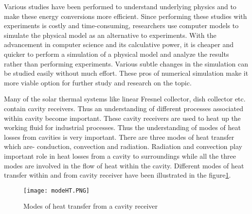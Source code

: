 
Various studies have been performed to understand underlying physics and to make these energy conversions more efficient. Since performing these studies with experiments is costly and time-consuming, researchers use computer models to simulate the physical model as an alternative to experiments. With the advancement in computer science and its calculative power, it is cheaper and quicker to perform a simulation of a physical model and analyze the results rather than performing experiments. Various subtle changes in the simulation can be studied easily without much effort. These pros of numerical simulation make it more viable option for further study and research on the topic. 

Many of the solar thermal systems like linear Fresnel collector, dish collector etc. contain cavity receivers. Thus an understanding of different processes associated within cavity become important. These cavity receivers are used to heat up the working fluid for industrial processes. Thus the understanding of modes of heat losses from cavities is very important. There are three modes of heat transfer which are- conduction, convection and radiation. Radiation and convection play important role in heat losses from a cavity to surroundings while all the three modes are involved in the flow of heat within the cavity. Different modes of heat transfer within and from cavity receiver have been illustrated in the figure\ref{modeht}. 

\begin{figure}[H]
\begin{center}
\texttt{[image: modeHT.PNG]}
\caption{Modes of heat transfer from a cavity receiver\citep{MOGHIMI2015343}}
\end{center}
\label{modeht}
\end{figure}


